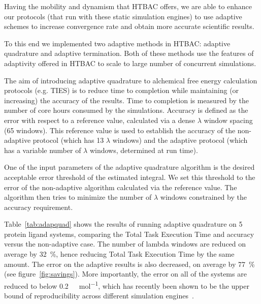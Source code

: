 
Having the mobility and dynamism that HTBAC offers, we are able to enhance our
protocols (that run with these static simulation engines) to use adaptive
schemes to increase convergence rate and obtain more accurate scientific
results.

To this end we implemented two adaptive methods in HTBAC: adaptive quadrature
and adaptive termination. Both of these methods use the features of adaptivity
offered in HTBAC to scale to large number of concurrent simulations.


The aim of introducing adaptive quadrature   to alchemical free energy calculation protocols (e.g. TIES) is
to reduce time to completion while maintaining (or increasing) the accuracy of
the results. Time to completion is measured by the number of core hours consumed
by the simulations. Accuracy is defined as the error with respect to a reference
value, calculated via a dense $\lambda$ window spacing (65 windows). This
reference value is used to establish the accuracy of the non-adaptive protocol
(which has 13 $\lambda$ windows) and the adaptive protocol (which has a variable
number of $\lambda$ windows, determined at run time).

One of the input parameters of the adaptive quadrature algorithm is the
desired acceptable error threshold of the estimated integral. We set this
threshold to the error of the non-adaptive algorithm calculated via the
reference value. The algorithm then tries to minimize the number of $\lambda$
windows constrained by the accuracy requirement.

Table~\ref{tab:adapquad} shows the results of running adaptive quadrature on 5
protein ligand systems, comparing the Total Task Execution Time and accuracy
versus the non-adaptive case. The number of lambda windows are reduced on
average by \SI{32}{\percent}, hence reducing Total Task Execution Time by the
same amount. The error on the adaptive results is also decreased, on average by
\SI{77}{\percent} (see figure~\ref{fig:savings}). More importantly, the error on
all of the systems are reduced to below \SI{0.2}{\kilo\calorie\per\mole}, which
has recently been shown to be the upper bound of reproducibility across
different simulation engines~\cite{Loeffler2018}.

